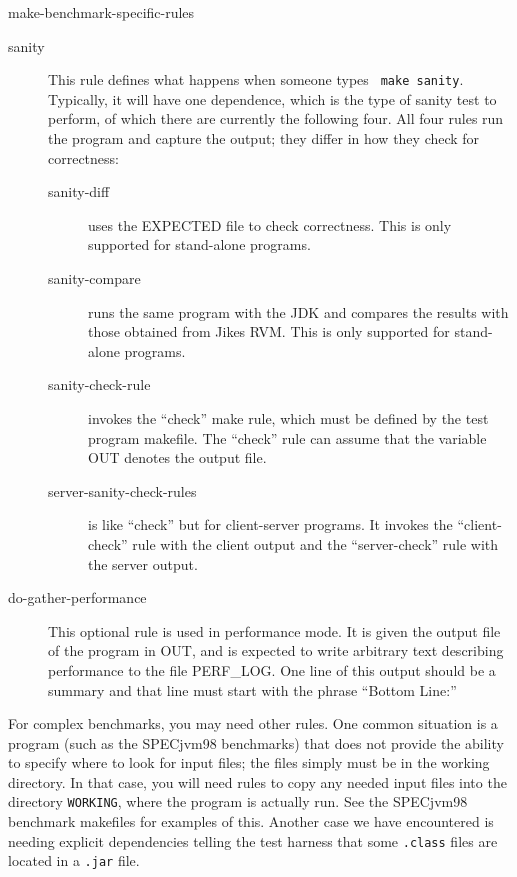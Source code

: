 \begin{description}
\begin{Label}{make-benchmark-specific-rules}
\begin{description}
\item[sanity] This rule defines what happens when someone types {\tt
make sanity}.  Typically, it will have one dependence, which is the type
of sanity test to perform, of which there are currently the following
four.  All four rules run the program and capture the output; they
differ in how they check for correctness:
\begin{description}
\item[sanity-diff] uses the EXPECTED file to check correctness.  This
is only supported for stand-alone programs.
\item[sanity-compare] runs the same program with the JDK and compares
the results with those obtained from Jikes RVM.  This is only supported for
stand-alone programs. 
\item[sanity-check-rule] invokes the ``check'' make rule, which must be
defined by the test program makefile.  The ``check'' rule can assume
that the variable OUT denotes the output file.
\item[server-sanity-check-rules] is like ``check'' but for
client-server programs.  It invokes the ``client-check'' rule with the
client output and the ``server-check'' rule with the server output.
\end{description}

\item[do-gather-performance]  This optional rule is used in
performance mode.  It is given the output file of the program in OUT,
and is expected to write arbitrary text describing performance to the
file PERF\_LOG.  One line of this output should be a summary and that
line must start with the phrase ``Bottom Line:''

\end{description}

For complex benchmarks, you may need other rules.  One common
situation is a program (such as the SPECjvm98 benchmarks)
that does not provide the ability to specify where to look for input
files; the files simply must be in the working directory.  In that
case, you will need rules to copy any needed input files into the
directory {\tt WORKING}, where the program is actually run.  See the SPECjvm98
benchmark makefiles for examples of this.  Another case we have
encountered is needing explicit dependencies telling the test harness
that some {\tt .class} files are located in a {\tt .jar} file.
\end{Label}

\end{description}

